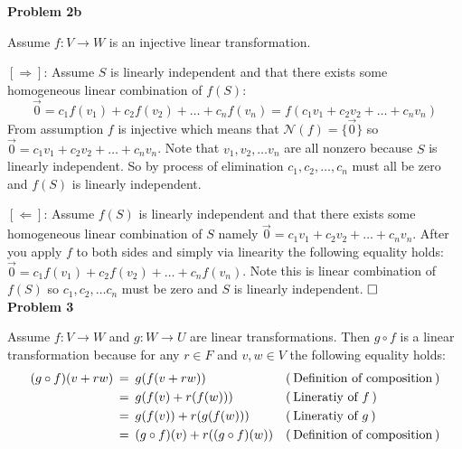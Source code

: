 \documentclass{article}
\newcommand{\problem}[1]{\large\textbf{Problem #1}\normalsize}
\newcommand{\evidence}[1]{\ensuremath{(\hspace{0.2em} \text{#1} \hspace{0.2em})}}
\newcommand{\relation}[1]{\ensuremath{\hspace{0.2em} {{} #1 {}} \hspace{0.2em}}}
\newcommand{\equal}{\relation{=}}
\newcommand{\qed}{\hfill\ensuremath{\square}}
\begin{document}
\problem{2b}

Assume $f : V \to W$ is an injective linear transformation.

$[\Rightarrow]$: Assume $S$ is linearly independent and that there exists some
homogeneous linear combination of $f(S)$:
\begin{equation*}
  \vec{0} = c_1f(v_1) + c_2f(v_2) + \dots + c_nf(v_n) = f(c_1v_1 + c_2v_2 + \dots + c_nv_n)
\end{equation*}
From assumption $f$ is injective which means that
$\mathcal{N}(f) = \{ \vec{0} \}$ so $\vec{0} = c_1v_1 + c_2v_2 + \dots +
c_nv_n$. Note that $v_1, v_2, \dots v_n$ are all nonzero because $S$ is linearly
independent. So by process of elimination $c_1, c_2,\dots,c_n$ must all be zero and
$f(S)$ is linearly independent.

\vspace{0.2em}

$[\Leftarrow]$: Assume $f(S)$ is linearly independent and that there exists some
homogeneous linear combination of $S$ namely
$\vec{0} = c_1v_1 + c_2v_2 + \dots + c_nv_n$. After you apply $f$ to both sides and simply
via linearity the following equality holds: $\vec{0} = c_1f(v_1) + c_2f(v_2) + \dots + c_nf(v_n)$. Note this
is linear combination of $f(S)$ so $c_1, c_2, \dots c_n$ must be zero and $S$ is
linearly independent. $\qed$ \\

\problem{3}

Assume $f : V \to W$ and $g : W \to U$ are linear transformations. Then $g \circ f$ is a
linear transformation because for any $r \in F$ and $v, w \in V$ the following
equality holds:
\begin{align*}
  (g \circ f)(v + rw)
     & \equal g(f(v + rw)) && \evidence{Definition of composition} \\
  {} & \equal g(f(v) + r(f(w))) && \evidence{Lineratiy of $f$} \\
  {} & \equal g(f(v)) + r(g(f(w))) && \evidence{Lineratiy of $g$} \\
  {} & \equal (g \circ f)(v) + r((g \circ f)(w)) && \evidence{Definition of composition}
\end{align*}
\end{document}
